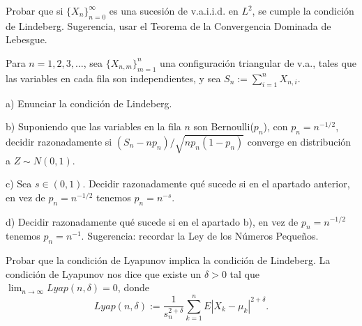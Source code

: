 
\begin{problem}[10]Probar que si $\{X_n\}_{n=0}^{\infty}$  es una sucesi\'on de v.a.i.i.d. en $L^2$, se cumple
la condici\'on de Lindeberg. Sugerencia, usar el Teorema de la Convergencia Dominada de
Lebesgue.
\solution

\begin{expla}

\end{expla}

\end{problem}


\begin{problem}[11] Para $n=1, 2, 3, \dots$, sea  $\{X_{n, m}\}_{m=1}^{n}$  una configuraci\'on triangular de v.a., tales que las variables en cada fila son independientes, y sea $S_{n} := \sum_{i=1}^n X_{n, i}$.

a) Enunciar la condici\'on de Lindeberg.

b) Suponiendo que las variables en la fila $n$ son Bernoulli($p_n$), con
$p_n = n^{- 1/2}$,
decidir razonadamente
si 
$(S_n - n p_n)/\sqrt{n p_n (1 - p_n)}$ converge en distribuci\'on a $Z\sim N(0,1)$.

c) Sea $s \in (0,1)$. Decidir razonadamente qu\'e sucede si en el apartado anterior, en
vez de  $p_n = n^{ - 1/2}$ tenemos $p_n = n^{ - s}$.

d) Decidir razonadamente qu\'e sucede si en el apartado b), en
vez de  $p_n = n^{- 1/2}$ tenemos $p_n = n^{ - 1}$.
Sugerencia: recordar la Ley de los N\'umeros Peque\~nos.
\solution

\begin{expla}

\end{expla}

\end{problem}


\begin{problem}[12] Probar que la condici\'on de Lyapunov implica la condici\'on de Lindeberg. 
La condici\'on de Lyapunov nos dice que existe un $\delta > 0$ tal que
$\lim_{n\to \infty} Lyap(n, \delta) = 0$, donde 
$$
Lyap(n, \delta) := \frac{1}{s_n^{2 + \delta}} \sum_{k=1}^n  E|X_k - \mu_k|^{2 + \delta} .
$$
\solution

\begin{expla}

\end{expla}

\end{problem}







